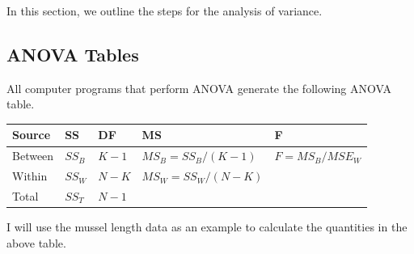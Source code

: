 \documentclass[
]{book}
\begin{document}
In this section, we outline the steps for the analysis of variance.

\hypertarget{anova-tables}{%
\subsection{ANOVA Tables}\label{anova-tables}}

All computer programs that perform ANOVA generate the following ANOVA table.

\begin{longtable}[]{@{}lllll@{}}
\toprule\noalign{}
Source & SS & DF & MS & F \\
\midrule\noalign{}
\endhead
\bottomrule\noalign{}
\endlastfoot
Between & \(SS_B\) & \(K-1\) & \(MS_B = SS_B/(K-1)\) & \(F=MS_B/MSE_W\) \\
Within & \(SS_W\) & \(N-K\) & \(MS_W = SS_W/(N-K)\) & \\
Total & \(SS_T\) & \(N-1\) & & \\
\end{longtable}

I will use the mussel length data as an example to calculate the quantities in the above table.
\end{document}
